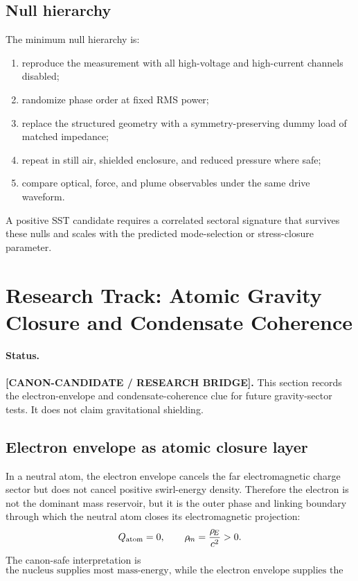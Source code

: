 \subsection{Null hierarchy}

The minimum null hierarchy is:
\begin{enumerate}
    \item reproduce the measurement with all high-voltage and high-current channels disabled;
    \item randomize phase order at fixed RMS power;
    \item replace the structured geometry with a symmetry-preserving dummy load of matched impedance;
    \item repeat in still air, shielded enclosure, and reduced pressure where safe;
    \item compare optical, force, and plume observables under the same drive waveform.
\end{enumerate}
A positive SST candidate requires a correlated sectoral signature that survives
these nulls and scales with the predicted mode-selection or stress-closure
parameter.

\section{Research Track: Atomic Gravity Closure and Condensate Coherence}
\label{sec:rt_atomic_gravity_closure_condensate}

\paragraph{Status.}
\textbf{[CANON-CANDIDATE / RESEARCH BRIDGE].}
This section records the electron-envelope and condensate-coherence clue for
future gravity-sector tests. It does not claim gravitational shielding.

\subsection{Electron envelope as atomic closure layer}

In a neutral atom, the electron envelope cancels the far electromagnetic charge
sector but does not cancel positive swirl-energy density. Therefore the electron
is not the dominant mass reservoir, but it is the outer phase and linking
boundary through which the neutral atom closes its electromagnetic projection:
\begin{align}
    Q_{\mathrm{atom}}=0,
    \qquad
    \rho_{\!m}
    =
    \frac{\rho_{\!E}}{c^2}
    >0.
    \label{eq:rt_atomic_charge_mass_split}
\end{align}
The canon-safe interpretation is
\begin{equation}
\boxed{
\text{the nucleus supplies most mass-energy, while the electron envelope supplies
      the neutral phase boundary and long-range matching layer.}
}
\label{eq:rt_atomic_electron_envelope_summary}
\end{equation}

